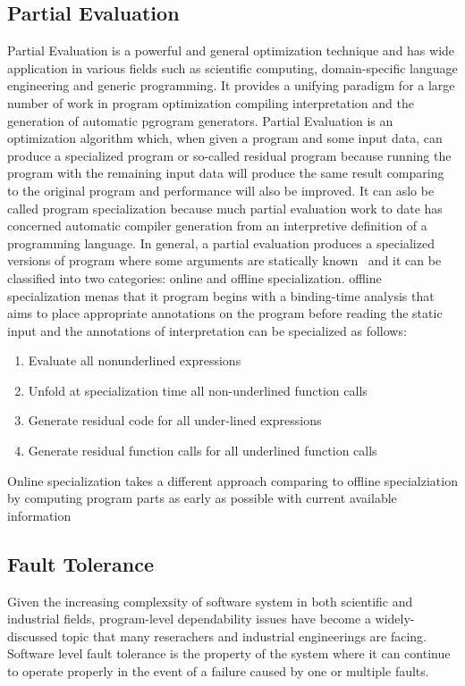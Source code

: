 \subsection{Partial Evaluation}
Partial Evaluation is a powerful and general optimization technique and has wide application in various fields such as scientific computing, domain-specific language engineering and generic programming.
It provides a unifying paradigm for a large number of work in program optimization compiling interpretation and the generation of automatic pgrogram generators.
Partial Evaluation is an optimization algorithm which, when given a program and some input data, can produce a specialized program or so-called residual program because running the program with the remaining input data will produce the same result comparing to the original program and performance will also be improved.
It can aslo be called program specialization because much partial evaluation work to date has concerned automatic compiler generation from an interpretive definition of a programming language.
In general, a partial evaluation produces a specialized versions of program where some arguments are statically known~\cite{Jones1996} and it can be classified into two categories: online and offline specialization. offline specialization menas that it program begins with a binding-time analysis that aims to place appropriate annotations on the program before reading the static input and the annotations of interpretation can be specialized as follows:
\begin{enumerate}
\item Evaluate all nonunderlined expressions
\item Unfold at specialization time all non-underlined function calls
\item Generate residual code for all under-lined expressions
\item Generate residual function calls for all underlined function calls
\end{enumerate}
Online specialization takes a different approach comparing to offline specialziation by computing program parts as early as possible with current available information 

\subsection{Fault Tolerance}
Given the increasing complexsity of software system in both scientific and industrial fields, program-level dependability issues have become a widely-discussed topic that many reserachers and industrial engineerings are facing. Software level fault tolerance is the property of the system where it can continue to operate properly in the event of a failure caused by one or multiple faults.

